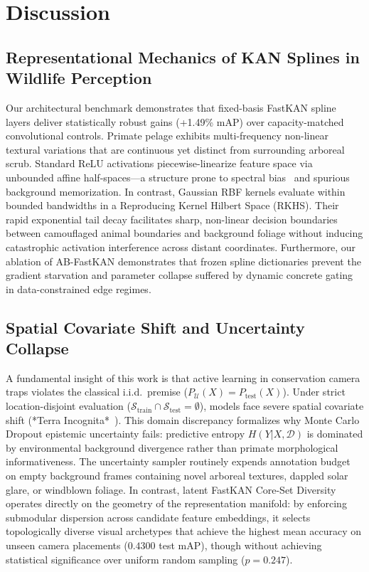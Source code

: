 \documentclass[conference]{IEEEtran}
\begin{document}
\section{Discussion}

\subsection{Representational Mechanics of KAN Splines in Wildlife Perception}
Our architectural benchmark demonstrates that fixed-basis FastKAN spline layers deliver statistically robust gains (+1.49\% mAP) over capacity-matched convolutional controls. Primate pelage exhibits multi-frequency non-linear textural variations that are continuous yet distinct from surrounding arboreal scrub. Standard ReLU activations piecewise-linearize feature space via unbounded affine half-spaces---a structure prone to spectral bias~\cite{rahaman2019spectral} and spurious background memorization. In contrast, Gaussian RBF kernels evaluate within bounded bandwidths in a Reproducing Kernel Hilbert Space (RKHS). Their rapid exponential tail decay facilitates sharp, non-linear decision boundaries between camouflaged animal boundaries and background foliage without inducing catastrophic activation interference across distant coordinates. Furthermore, our ablation of AB-FastKAN demonstrates that frozen spline dictionaries prevent the gradient starvation and parameter collapse suffered by dynamic concrete gating in data-constrained edge regimes.

\subsection{Spatial Covariate Shift and Uncertainty Collapse}
A fundamental insight of this work is that active learning in conservation camera traps violates the classical i.i.d.\ premise ($P_{\mathcal{U}}(X) = P_{\text{test}}(X)$). Under strict location-disjoint evaluation ($\mathcal{S}_{\text{train}} \cap \mathcal{S}_{\text{test}} = \emptyset$), models face severe spatial covariate shift (*Terra Incognita*~\cite{beery2018recognition}).
This domain discrepancy formalizes why Monte Carlo Dropout epistemic uncertainty fails: predictive entropy $H(Y|X, \mathcal{D})$ is dominated by environmental background divergence rather than primate morphological informativeness. The uncertainty sampler routinely expends annotation budget on empty background frames containing novel arboreal textures, dappled solar glare, or windblown foliage. In contrast, latent FastKAN Core-Set Diversity operates directly on the geometry of the representation manifold: by enforcing submodular dispersion across candidate feature embeddings, it selects topologically diverse visual archetypes that achieve the highest mean accuracy on unseen camera placements ($0.4300$ test mAP), though without achieving statistical significance over uniform random sampling ($p = 0.247$).
\end{document}
